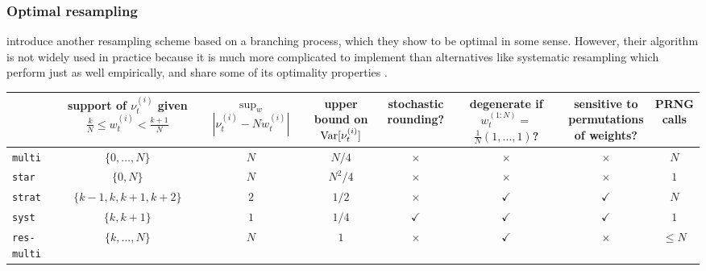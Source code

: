 \subsubsection{Optimal resampling}
\textcite{crisan1999} introduce another resampling scheme based on a branching process, which they show to be optimal in some sense. However, their algorithm is not widely used in practice because it is much more complicated to implement than alternatives like systematic resampling which perform just as well empirically, and share some of its optimality properties \parencite{bain2008}. 



\begin{landscape}
\begin{table}[ht]
\centering
\begin{tabular}{ l | c c c c c c c }
\hline\hline
& \thead{support of $\nu_t^{(i)}$ given
            \\ $ \frac{k}{N} \leq w_t^{(i)} < \frac{k+1}{N}$} 
        & \thead{$\sup_w$\\ $|\nu_t^{(i)} - Nw_t^{(i)}|$}
        & \thead{upper\\ bound on \\ $\operatorname{Var}[\nu_t^{(i)}]$}
        & \thead{stochastic\\ rounding?}       
        & \thead{degenerate if\\ $w_t^{(1:N)} =$\\ $\frac{1}{N}(1,\dots,1)$?} 
        & \thead{sensitive to\\ permutations\\ of weights?} 
        & \thead{PRNG\\ calls} \\
\hline
\texttt{multi} & $\{0,\dots,N\}$ & $N$ & $N/4$ & $\times$ & $\times$ 
        & $\times$ & $N$ \\
\texttt{star} & $\{0, N\}$ & $N$ & $N^2/4$ & $\times$ & $\times$ 
        & $\times$ & $1$ \\
\texttt{strat} & $\{k-1, k, k+1, k+2\}$ & $2$ & $1/2$ & $\times$ & $\checkmark$ 
        & $\checkmark$ & $N$ \\
\texttt{syst} & $\{k, k+1\}$ & $1$ & $1/4$ & $\checkmark$ & $\checkmark$ 
        & $\checkmark$ & $1$ \\
\texttt{res-multi} & $\{k,\dots,N\}$ & $N$ & $1$ & $\times$ & $\checkmark$ 
        & $\times$ & $\leq N$ \\

\end{tabular}
\end{table}
\end{landscape}
